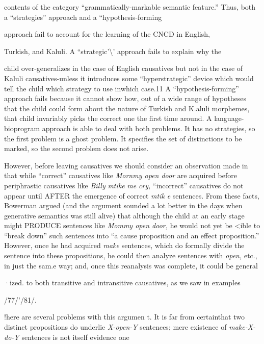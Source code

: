 contents of the category ``grammatically-markable semantic feature.'' Thus, both a ``strategies'' approach and a ``hypothesis-forming{\textquotedbl}

approach fail to account for the learning of the CNCD in English,

Turkish, and Kaluli. A ``strategic'{\textbackslash}' approach fails to explain why the


child over-generalizes in the case of English causatives but not in the case of Kaluli causatives{}-unless it introduces some ``hyperstrategic'' device which would tell the child which strategy to use inwhich case.11 A ``hypothesis-forming'' approach fails because it cannot show how, out of a wide range of hypotheses that the child could form about the nature of Turkish and K.aluli morphemes, that child invariably picks the correct one the first time around. A language-bioprogram approach is able to deal with both problems. It has no strategies, so the first problem is a ghost problem. It specifies the set of distinctions to be marked, so the second problem does not arise.

However, before leaving causatives we should consider an obser\-vation made in \citet{Bowerman1974} that while ``correct'' causatives like \textit{Mornmy open door }are acquired before periphrastic causatives like \textit{Billy }\textit{mtike} \textit{me} \textit{cry,} ``incorrect'' causatives do not appear until AFTER the emergence of correct \textit{mtik} \textit{e} sentences. From these facts, Bowerman argued (and the argument sounded a lot better in the days when genera\-tive semantics was still alive) that although the child at an early stage might PRODUCE sentences like \textit{Mommy open door, }he would not yet be {\textless}ible to ``break down'' such sentences into ``a cause proposition and an effect proposition.'' However, once he had acquired \textit{make} sentences, which do formally divide the sentence into these proposi\-tions, he could then analyze sentences with \textit{open, }etc., in just the sam.e way; and, once this reanalysis was complete, it could be general\-

·ized. to both transitive and intransitive causatives, as we saw in examples

/77/'/81/.

!here are several problems with this argumen t. It is far from certainthat two distinct propositions do underlie \textit{X-open-Y }sentences; mere existence of \textit{make-X-do-Y }sentences is not itself evidence one

